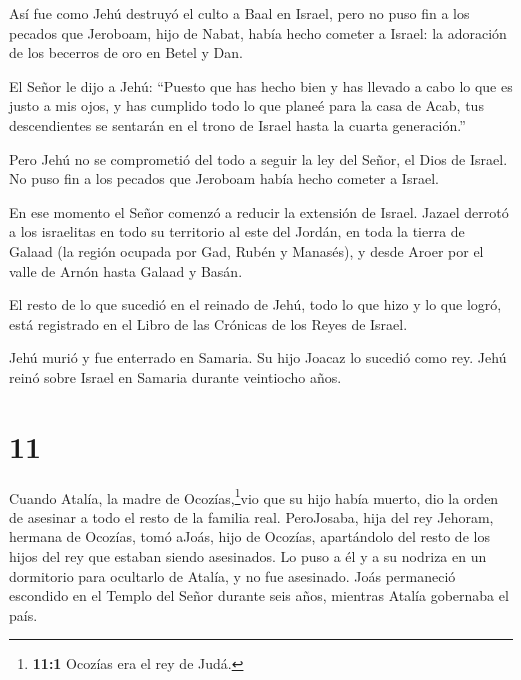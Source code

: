  Así fue como Jehú destruyó el culto a Baal en Israel,
 pero no puso fin a los pecados que Jeroboam, hijo de
Nabat, había hecho cometer a Israel: la adoración de los becerros de oro
en Betel y Dan.

 El Señor le dijo a Jehú: ``Puesto que has hecho bien y has
llevado a cabo lo que es justo a mis ojos, y has cumplido todo lo que
planeé para la casa de Acab, tus descendientes se sentarán en el trono
de Israel hasta la cuarta generación.''

 Pero Jehú no se comprometió del todo a seguir la ley del
Señor, el Dios de Israel. No puso fin a los pecados que Jeroboam había
hecho cometer a Israel.

 En ese momento el Señor comenzó a reducir la extensión de
Israel. Jazael derrotó a los israelitas en todo su territorio
 al este del Jordán, en toda la tierra de Galaad (la región
ocupada por Gad, Rubén y Manasés), y desde Aroer por el valle de Arnón
hasta Galaad y Basán.

 El resto de lo que sucedió en el reinado de Jehú, todo lo
que hizo y lo que logró, está registrado en el Libro de las Crónicas de
los Reyes de Israel.

 Jehú murió y fue enterrado en Samaria. Su hijo Joacaz lo
sucedió como rey.  Jehú reinó sobre Israel en Samaria
durante veintiocho años.

\hypertarget{section-10}{%
\section{11}\label{section-10}}

 Cuando Atalía, la madre de Ocozías,\footnote{\textbf{11:1}
  Ocozías era el rey de Judá.}vio que su hijo había muerto, dio la orden
de asesinar a todo el resto de la familia real.  PeroJosaba,
hija del rey Jehoram, hermana de Ocozías, tomó aJoás, hijo de Ocozías,
apartándolo del resto de los hijos del rey que estaban siendo
asesinados. Lo puso a él y a su nodriza en un dormitorio para ocultarlo
de Atalía, y no fue asesinado.  Joás permaneció escondido en
el Templo del Señor durante seis años, mientras Atalía gobernaba el
país.

